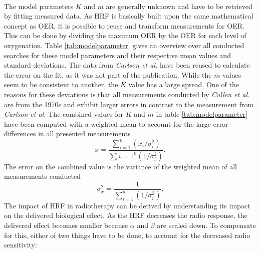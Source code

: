 \\The model parameters $K$ and $m$ are generally unknown and have to be retrieved by fitting measured data. As HRF is basically built upon the same mathematical concept as OER, it is possible to reuse and transform measurements for OER. This can be done by dividing the maximum OER by the OER for each level of oxygenation. Table \ref{tab:modelparameter} gives an overview over all conducted searches for these model parameters and their respective mean values and standard deviations. The data from \textit{Carlson et al.}\cite{pmid21183291} have been reused to calculate the error on the fit, as it was not part of the publication. While the $m$ values seem to be consistent to another, the $K$ value has a large spread. One of the reasons for these deviations is that all measurements conducted by \textit{Cullen et al.}\cite{pmid4616914, pmid1084867} are from the 1970s and exhibit larger errors in contrast to the measurement from  \textit{Carlson et al.} The combined values for $K$ and $m$ in table \ref{tab:modelparameter} have been computed with a weighted mean to account for the large error differences in all presented measurements
\begin{equation}
\overline x = \frac{\sum\limits_{i=1}^n(x_i/\sigma_i^2)}{\sum\limits{i=1}^n(1/\sigma_i^2)}.
\end{equation}
The error on the combined value is the variance of the weighted mean of all measurements conducted
\begin{equation}
\sigma^2_{\overline x} = \frac{1}{\sum\limits_{i=1}^n(1/\sigma_i^2)}.
\end{equation}
The impact of HRF in radiotherapy can be derived by understanding its impact on the delivered biological effect. As the HRF decreases the radio response, the delivered effect becomes smaller because $\alpha$ and $\beta$ are scaled down. To compensate for this, either of two things have to be done, to account for the decreased radio sensitivity:
